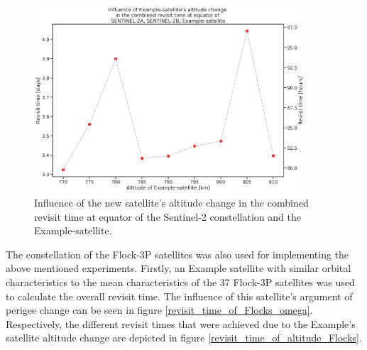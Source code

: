 \begin{figure}
\centering
\includegraphics[width=0.9\textwidth]{Images/revisit_time_ofdoubleaxisaltitude_SENTINEL-2A_SENTINEL-2B_Example-satellite.png}
\caption{Influence of the new satellite's altitude change in the combined revisit time at equator of the Sentinel-2 constellation and the Example-satellite.}
\label{revisit_time_ofdoubleaxisaltitude_SENTINEL-2A_SENTINEL-2B_Example-satellite}
\end{figure}


The constellation of the Flock-3P satellites was also used for implementing the above mentioned experiments. Firstly, an Example satellite with similar orbital characteristics to the mean characteristics of the 37 Flock-3P satellites was used to calculate the overall revisit time. The influence of this satellite's argument of perigee change can be seen in figure \ref{revisit_time_of_Flocks_omega}. Respectively, the different revisit times that were achieved due to the Example's satellite altitude change are depicted in figure \ref{revisit_time_of_altitude_Flocks}.

